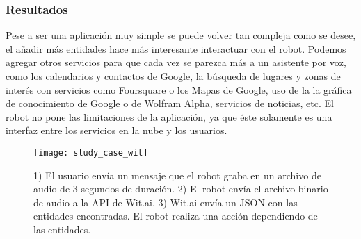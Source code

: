 
\subsubsection{Resultados}

Pese a ser una aplicación muy simple
se puede volver tan compleja como se desee,
el añadir más entidades hace más interesante interactuar con el
robot. Podemos agregar otros servicios para
que cada vez se parezca más a un asistente por voz,
como los calendarios y contactos de Google, la búsqueda de lugares y
zonas de interés con servicios como Foursquare o los Mapas de Google,
uso de la la gráfica de conocimiento de Google o de Wolfram Alpha, 
servicios de noticias, etc. El robot no pone las limitaciones 
de la aplicación, ya que éste solamente es una interfaz
entre los servicios en la nube y los usuarios.

\begin{figure}[H]
\centering
\caption{1) El usuario envía un mensaje que el robot graba en un archivo de audio de 3 segundos de duración. 2) El robot envía el archivo binario de audio
a la API de Wit.ai. 3) Wit.ai envía un JSON con las entidades encontradas. El robot realiza una acción dependiendo de las entidades.}
\texttt{[image: study\_case\_wit]}
\end{figure}

